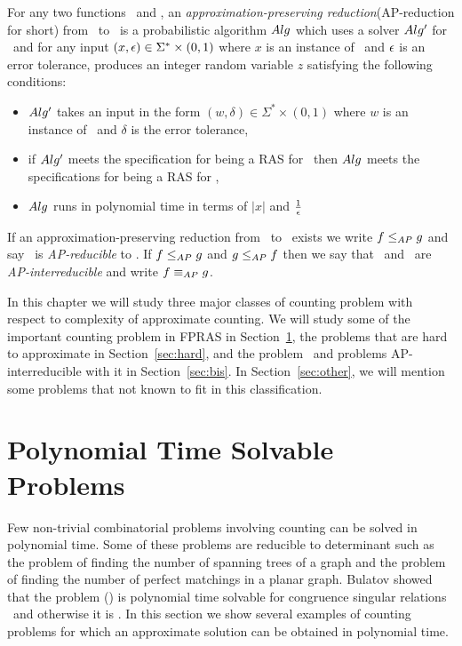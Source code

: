 \begin{defi}[AP-reduction]
For any two functions \mf\ and \mg, 
an \emph{approximation-preserving reduction}(AP-reduction for short)
from \mf\ to \mg\ is a probabilistic algorithm \(Alg\) which uses a solver
\(Alg'\) for \mg\ and for any input \((x,\epsilon) \in \Sigma^*\times(0,1)\) where \(x\)
is an instance of \mf\ and \(\epsilon\) is an error tolerance, produces an integer random variable \(z\)
satisfying the following  conditions: 
\begin{itemize}
\item \(Alg'\) takes an input in the form \((w,\delta) \in \Sigma^*\times(0,1)\)
where \(w\) is an instance of \mg\
and \(\delta\) is the error tolerance,
\item if \(Alg'\) meets the specification for being a RAS for 
\mg\ then \(Alg\) meets the specifications for being a RAS for \mf, 
\item \(Alg\) runs in polynomial time in terms of \(|x|\) and \(\frac{1}{\epsilon}\)
\end{itemize}
\end{defi}

If an approximation-preserving reduction from \mf\ to \mg\ exists we write \(f \le_{AP} g\)
and say \mf\ is \emph{AP-reducible} to \mg. If \(f \le_{AP} g\) and \(g \le_{AP} f\)
then we say that  \mf\ and \mg\ are \emph{AP-interreducible} and write \(f \equiv_{AP} g\)\@. 


In this chapter we will study three major classes of counting problem with respect
to complexity of approximate counting. We will study some of the important counting problem in FPRAS
in Section~\ref{sec:poly}, the problems that are hard to approximate in Section~\ref{sec:hard}, 
and the problem \cbis\ and problems AP-interreducible with it in Section~\ref{sec:bis}\@.
In Section~\ref{sec:other}, we will mention some problems that not known to fit in this classification.

\section{Polynomial Time Solvable Problems} \label{sec:poly}
Few non-trivial combinatorial problems involving counting 
can be solved in polynomial time.
Some of these problems are reducible to determinant such as
the problem of finding the number of spanning trees of a graph and 
the problem of finding the number of perfect matchings in a planar graph.
Bulatov \cite{Bulatov} showed that the problem \ccsp(\mrelset) is polynomial time solvable
for congruence singular relations \mrelset\ and otherwise it is \cpc\@.
In this section we show several
examples of counting problems for which an approximate solution can be obtained in polynomial time.

